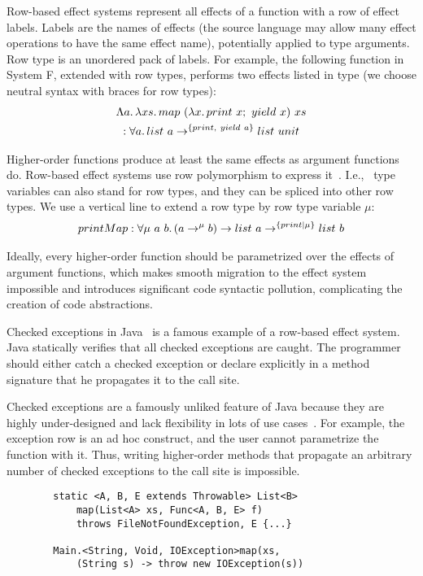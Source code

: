 \documentclass[conference]{IEEEtran}
\newcommand{\seq}{;~}
\newcommand{\ap}{~}
\begin{document}
    Row-based effect systems represent all effects of a function with a row of effect labels.
    Labels are the names of effects (the source language may allow many effect operations to have the same effect name), potentially applied to type arguments.
    Row type is an unordered pack of labels.
    For example, the following function in System F, extended with row types, performs two effects listed in type (we choose neutral syntax with braces for row types):
    \begin{multline*}
        \Lambda a\ldotp\lambda xs\ldotp map \ap (\lambda x\ldotp print\ap x\seq yield\ap x) \ap xs \\ : \forall a \ldotp list\ap a \to^{\{print, ~yield \ap a\}} list \ap unit
    \end{multline*}

    Higher-order functions produce at least the same effects as argument functions do.
    Row-based effect systems use row polymorphism to express it~\cite{gaster1996polymorphic}.
    I.e., \ type variables can also stand for row types, and they can be spliced into other row types.
    We use a vertical line to extend a row type by row type variable $\mu$:
    \begin{multline*}
        printMap : \forall \mu \ap a \ap b\ldotp (a \to^\mu b) \to list \ap a \to^{\{print|\mu\}} list \ap b
    \end{multline*}

    Ideally, every higher-order function should be parametrized over the effects of argument functions, which makes smooth migration to the effect system impossible and introduces significant code syntactic pollution, complicating the creation of code abstractions.


    Checked exceptions in Java~\cite{gosling2000java} is a famous example of a row-based effect system.
    Java statically verifies that all checked exceptions are caught.
    The programmer should either catch a checked exception or declare explicitly in a method signature that he propagates it to the call site.

    Checked exceptions are a famously unliked feature of Java because they are highly under-designed and lack flexibility in lots of use cases~\cite{checked-exceptions}.
    For example, the exception row is an ad hoc construct, and the user cannot parametrize the function with it.
    Thus, writing higher-order methods that propagate an arbitrary number of checked exceptions to the call site is impossible.

    \begin{verbatim}
        static <A, B, E extends Throwable> List<B>
            map(List<A> xs, Func<A, B, E> f)
            throws FileNotFoundException, E {...}

        Main.<String, Void, IOException>map(xs,
            (String s) -> throw new IOException(s))
    \end{verbatim}
\end{document}
